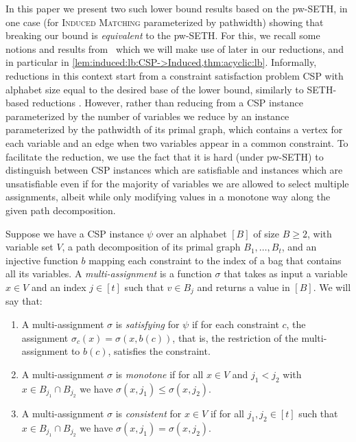 In this paper we present two such lower bound results based on the pw-SETH, in
one case (for \textsc{Induced Matching} parameterized by pathwidth) showing
that breaking our bound is \emph{equivalent} to the pw-SETH. For this, we
recall some notions and results from~\cite{soda/Lampis25} which we will make
use of later in our reductions, and in particular in
\cref{lem:induced:lb:CSP->Induced,thm:acyclic:lb}. Informally, reductions in
this context start from a constraint satisfaction problem \textsc{CSP} with
alphabet size equal to the desired base of the lower bound, similarly to
SETH-based reductions \cite{siamdm/Lampis20}. However, rather than reducing
from a \textsc{CSP} instance parameterized by the number of variables we reduce
by an instance parameterized by the pathwidth of its primal graph, which
contains a vertex for each variable and an edge when two variables appear in a
common constraint. To facilitate the reduction, we use the fact that it is hard
(under pw-SETH) to distinguish between \textsc{CSP} instances which are
satisfiable and instances which are unsatisfiable even if for the majority of
variables we are allowed to select multiple assignments, albeit while only
modifying values in a monotone way along the given path decomposition.


\begin{definition}
    Suppose we have a \textsc{CSP} instance $\psi$ over an alphabet $[B]$ of size $B \ge 2$,
    with variable set $V$, a path decomposition of its primal graph $B_1,\ldots, B_t$,
    and an injective function $b$ mapping each constraint to the index of a bag that contains all its variables.
    A \emph{multi-assignment} is a function $\sigma$ that takes as input a variable
    $x \in V$ and an index $j \in [t]$ such that $v \in B_j$ and returns a value in $[B]$.
    We will say that:
    \begin{enumerate}
        \item A multi-assignment $\sigma$ is \emph{satisfying} for $\psi$ if for each constraint $c$,
        the assignment $\sigma_c(x) = \sigma(x,b(c))$, that is,
        the restriction of the multi-assignment to $b(c)$,
        satisfies the constraint.

        \item A multi-assignment $\sigma$ is \emph{monotone} if for all $x \in V$ and $j_1<j_2$
        with $x \in B_{j_1} \cap B_{j_2}$ we have $\sigma(x,j_1) \le \sigma(x,j_2)$.

        \item A multi-assignment $\sigma$ is \emph{consistent} for $x \in V$ if for all
        $j_1,j_2 \in [t]$ such that $x \in B_{j_1} \cap B_{j_2}$
        we have $\sigma(x,j_1)=\sigma(x,j_2)$.
    \end{enumerate}
\end{definition}



